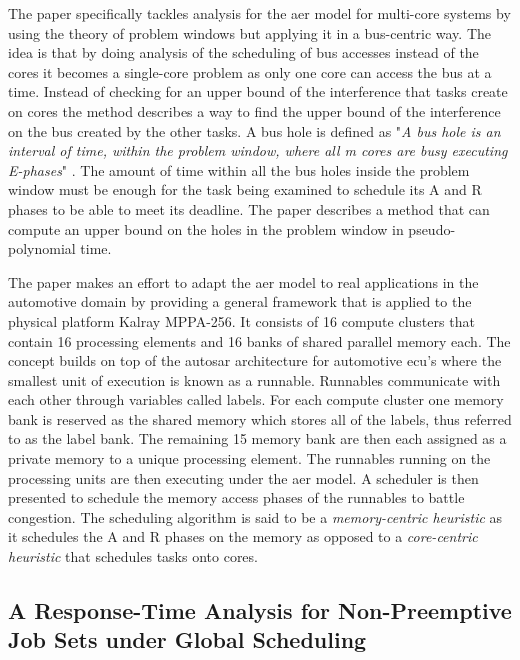 \documentclass{kththesis}
\begin{document}
The paper \parencite{maia_schedulability_2017} specifically tackles analysis for the \acrshort{aer}
model for multi-core systems by using the theory of problem windows but applying it in a bus-centric
way. The idea is that by doing analysis of the scheduling of bus accesses instead of the cores it
becomes a single-core problem as only one core can access the bus at a time.  Instead of checking
for an upper bound of the interference that tasks create on cores the method describes a way to find
the upper bound of the interference on the bus created by the other tasks. A bus hole is defined as
"\textit{A bus hole is an interval of time, within the problem window, where all m cores are busy
executing E-phases}" \parencite{maia_schedulability_2017}. The amount of time within all the bus
holes inside the problem window must be enough for the task being examined to schedule its A and R
phases to be able to meet its deadline. The paper describes a method that can compute an upper bound
on the holes in the problem window in pseudo-polynomial time.

The paper \parencite{becker_contention-free_2016} makes an effort to adapt the \acrshort{aer} model
to real applications in the automotive domain by providing a general framework that is applied to
the physical platform Kalray MPPA-256. It consists of 16 compute clusters that contain 16 processing
elements and 16 banks of shared parallel memory each. The concept builds on top of the
\acrshort{autosar} architecture for automotive \acrshort{ecu}'s where the smallest unit of execution
is known as a runnable. Runnables communicate with each other through variables called labels. For
each compute cluster one memory bank is reserved as the shared memory which stores all of the
labels, thus referred to as the label bank. The remaining 15 memory bank are then each assigned as a
private memory to a unique processing element. The runnables running on the processing units are
then executing under the \acrshort{aer} model. A scheduler is then presented to schedule the memory
access phases of the runnables to battle congestion. The scheduling algorithm is said to be a
\textit{memory-centric heuristic} as it schedules the A and R phases on the memory as opposed to a
\textit{core-centric heuristic} that schedules tasks onto cores.


\subsection{A Response-Time Analysis for Non-Preemptive Job Sets under Global
Scheduling}\label{subsec:artafnpjsug}
\end{document}
